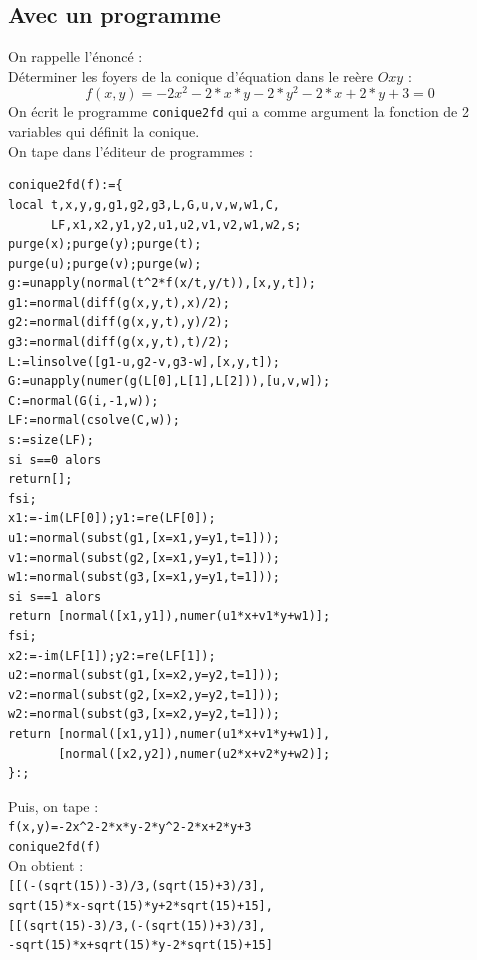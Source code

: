 \documentclass[a4paper,11pt]{book}
\begin{document}
\subsection{Avec un programme}
On rappelle l'\'enonc\'e :\\
D\'eterminer les foyers de la conique d'\'equation dans le re\`ere $Oxy$ :
$$f(x,y)=-2x^2-2*x*y-2*y^2-2*x+2*y+3=0$$
On \'ecrit le programme {\tt conique2fd} qui a comme argument la fonction de 
2 variables qui d\'efinit la conique.\\
On tape dans l'\'editeur de programmes :
\begin{verbatim}
conique2fd(f):={
local t,x,y,g,g1,g2,g3,L,G,u,v,w,w1,C, 
      LF,x1,x2,y1,y2,u1,u2,v1,v2,w1,w2,s;
purge(x);purge(y);purge(t);
purge(u);purge(v);purge(w);
g:=unapply(normal(t^2*f(x/t,y/t)),[x,y,t]);
g1:=normal(diff(g(x,y,t),x)/2);
g2:=normal(diff(g(x,y,t),y)/2);
g3:=normal(diff(g(x,y,t),t)/2);
L:=linsolve([g1-u,g2-v,g3-w],[x,y,t]);
G:=unapply(numer(g(L[0],L[1],L[2])),[u,v,w]);
C:=normal(G(i,-1,w));
LF:=normal(csolve(C,w));
s:=size(LF);
si s==0 alors 
return[]; 
fsi;
x1:=-im(LF[0]);y1:=re(LF[0]);
u1:=normal(subst(g1,[x=x1,y=y1,t=1]));
v1:=normal(subst(g2,[x=x1,y=y1,t=1]));
w1:=normal(subst(g3,[x=x1,y=y1,t=1]));
si s==1 alors 
return [normal([x1,y1]),numer(u1*x+v1*y+w1)];
fsi;
x2:=-im(LF[1]);y2:=re(LF[1]);
u2:=normal(subst(g1,[x=x2,y=y2,t=1]));
v2:=normal(subst(g2,[x=x2,y=y2,t=1]));
w2:=normal(subst(g3,[x=x2,y=y2,t=1]));
return [normal([x1,y1]),numer(u1*x+v1*y+w1)],
       [normal([x2,y2]),numer(u2*x+v2*y+w2)];
}:;
\end{verbatim}
Puis, on tape :\\
{\tt f(x,y)=-2x\verb|^|2-2*x*y-2*y\verb|^|2-2*x+2*y+3}\\
{\tt conique2fd(f)}\\
On obtient :\\
{\tt [[(-(sqrt(15))-3)/3,(sqrt(15)+3)/3],\\ sqrt(15)*x-sqrt(15)*y+2*sqrt(15)+15],}\\
{\tt [[(sqrt(15)-3)/3,(-(sqrt(15))+3)/3],\\ -sqrt(15)*x+sqrt(15)*y-2*sqrt(15)+15]}
\end{document}
